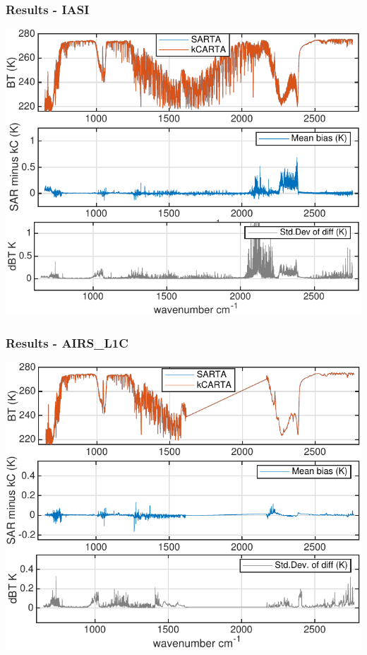 \documentclass[10pt,t]{beamer}
\begin{document}
\begin{frame}
  \frametitle{Results - IASI}
  \begin{center}
    \includegraphics[width=0.9\linewidth]{./Figs/Pdf/kc_sar_iasi_mean_bias_stdv_sea_6angs_aslp.pdf}
  \end{center}
      
 \end{frame}

\begin{frame}
  \frametitle{Results - AIRS\_L1C}
  \begin{center}
    \includegraphics[width=0.9\linewidth]{./Figs/Pdf/kc_sar_airs_l1c_mean_bias_stdv_sea_6angs_aslp.pdf}
  \end{center}
      
 \end{frame}
\end{document}

